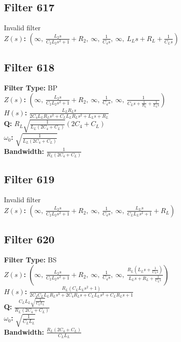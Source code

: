 \documentclass{article}
\begin{document}
\subsection*{Filter 617}
Invalid filter \\ 
\textbf{$Z(s)$:} $\left( \infty, \  \frac{L_{2} s}{C_{2} L_{2} s^{2} + 1} + R_{2}, \  \infty, \  \frac{1}{C_{4} s}, \  \infty, \  L_{L} s + R_{L} + \frac{1}{C_{L} s}\right)$ \\ 
\subsection*{Filter 618}
\textbf{Filter Type:} BP \\ 
\textbf{$Z(s)$:} $\left( \infty, \  \frac{L_{2} s}{C_{2} L_{2} s^{2} + 1} + R_{2}, \  \infty, \  \frac{1}{C_{4} s}, \  \infty, \  \frac{1}{C_{L} s + \frac{1}{R_{L}} + \frac{1}{L_{L} s}}\right)$ \\ 
\textbf{$H(s)$:} $\frac{L_{L} R_{L} s}{2 C_{4} L_{L} R_{L} s^{2} + C_{L} L_{L} R_{L} s^{2} + L_{L} s + R_{L}}$ \\ 
\textbf{Q:} $R_{L} \sqrt{\frac{1}{L_{L} \left(2 C_{4} + C_{L}\right)}} \left(2 C_{4} + C_{L}\right)$ \\ 
\textbf{$\omega_0$:} $\sqrt{\frac{1}{L_{L} \left(2 C_{4} + C_{L}\right)}}$ \\ 
\textbf{Bandwidth:} $\frac{1}{R_{L} \left(2 C_{4} + C_{L}\right)}$ \\ 
\subsection*{Filter 619}
Invalid filter \\ 
\textbf{$Z(s)$:} $\left( \infty, \  \frac{L_{2} s}{C_{2} L_{2} s^{2} + 1} + R_{2}, \  \infty, \  \frac{1}{C_{4} s}, \  \infty, \  \frac{L_{L} s}{C_{L} L_{L} s^{2} + 1} + R_{L}\right)$ \\ 
\subsection*{Filter 620}
\textbf{Filter Type:} BS \\ 
\textbf{$Z(s)$:} $\left( \infty, \  \frac{L_{2} s}{C_{2} L_{2} s^{2} + 1} + R_{2}, \  \infty, \  \frac{1}{C_{4} s}, \  \infty, \  \frac{R_{L} \left(L_{L} s + \frac{1}{C_{L} s}\right)}{L_{L} s + R_{L} + \frac{1}{C_{L} s}}\right)$ \\ 
\textbf{$H(s)$:} $\frac{R_{L} \left(C_{L} L_{L} s^{2} + 1\right)}{2 C_{4} C_{L} L_{L} R_{L} s^{3} + 2 C_{4} R_{L} s + C_{L} L_{L} s^{2} + C_{L} R_{L} s + 1}$ \\ 
\textbf{Q:} $\frac{C_{L} L_{L} \sqrt{\frac{1}{C_{L} L_{L}}}}{R_{L} \left(2 C_{4} + C_{L}\right)}$ \\ 
\textbf{$\omega_0$:} $\sqrt{\frac{1}{C_{L} L_{L}}}$ \\ 
\textbf{Bandwidth:} $\frac{R_{L} \left(2 C_{4} + C_{L}\right)}{C_{L} L_{L}}$ \\ 
\end{document}
